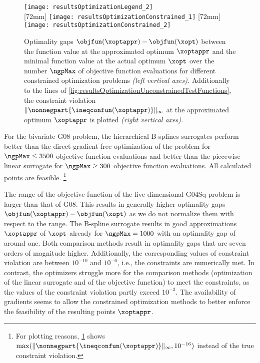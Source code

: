 \begin{figure}
  \texttt{[image: resultsOptimizationLegend\_2]}\\[2mm]%
  [72mm]{%
    \texttt{[image: resultsOptimizationConstrained\_1]}%
  }%
  \hfill%
  [72mm]{%
    \texttt{[image: resultsOptimizationConstrained\_2]}%
  }%
  \caption[Optimality gaps for different objective functions (constrained)]{%
    Optimality gaps $\objfun(\xoptappr) - \objfun(\xopt)$ between
    the function value at the approximated optimum $\xoptappr$ and
    the minimal function value at the actual optimum $\xopt$
    over the number $\ngpMax$ of objective function evaluations
    for different constrained optimization problems
    \emph{(left vertical axes).}
    Additionally to the lines of
    \cref{fig:resultsOptimizationUnconstrainedTestFunctions},
    the constraint violation
    $\norm[\infty]{\nonnegpart{\ineqconfun(\xoptappr)}}$
    at the approximated optimum $\xoptappr$ is plotted
    \emph{(right vertical axes).}%
  }%
  \label{fig:resultsOptimizationConstrainedTestFunctions}%
\end{figure}

For the bivariate G08 problem, the hierarchical B-splines surrogates
perform better than the direct gradient-free optimization of the problem
for $\ngpMax \le 3500$ objective function evaluations
and better than the piecewise linear surrogate for $\ngpMax \ge 300$
objective function evaluations.
All calculated points are feasible.%
\footnote{%
  For plotting reasons,
  \cref{fig:resultsOptimizationConstrainedTestFunctions} shows
  $\max(\norm[\infty]{\nonnegpart{\ineqconfun(\xoptappr)}}, 10^{-16})$
  instead of the true constraint violation.%
}

The range of the objective function of the five-dimensional G04Sq problem
is larger than that of G08.
This results in generally higher optimality gaps
$\objfun(\xoptappr) - \objfun(\xopt)$ as we do not normalize them
with respect to the range.
The B-spline surrogate results in good approximations $\xoptappr$
of $\xopt$ already for $\ngpMax = 1000$ with an optimality gap of
around one.
Both comparison methods result in optimality gaps that are
seven orders of magnitude higher.
Additionally, the corresponding values of constraint violation
are between $10^{-10}$ and $10^{-6}$, i.e.,
the constraints are numerically met.
In contrast, the optimizers struggle more for
the comparison methods (optimization of the linear surrogate and
of the objective function) to meet the constraints,
as the values of the constraint violation partly exceed $10^{-3}$.
The availability of gradients seems to allow the constrained optimization
methods to better enforce the feasibility of the
resulting points $\xoptappr$.

